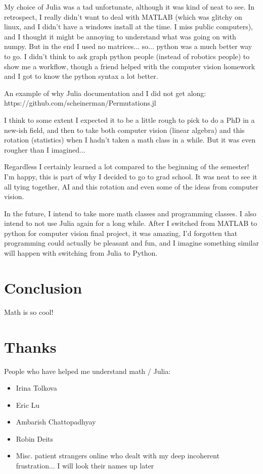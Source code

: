 \documentclass[a4paper]{article}
\begin{document}
My choice of Julia was a tad unfortunate, although it was kind of neat to see.
In retrospect, I really didn't want to deal with MATLAB (which was glitchy on
linux, and I didn't have a windows install at the time. I miss public
computers), and I thought it might be annoying to understand what was going on
with numpy. But in the end I used no matrices... so... python was a much better
way to go. I didn't think to ask graph python people (instead of robotics
people) to show me a workflow,
though a friend helped with the computer vision homework and I got to know the
python syntax a lot better.

An example of why Julia documentation and I did not get along:
https://github.com/scheinerman/Permutations.jl

I think to some extent I expected it to be a little rough to pick to do a PhD in a new-ish
field, and then to take both computer vision (linear algebra) and this rotation
(statistics) when I hadn't taken a math class in a while. But it was even
rougher than I imagined...

Regardless I certainly learned a lot compared to the beginning of the semester!
I'm happy, this is part of why I decided to go to grad school. It was
neat to see it all tying together, AI and this rotation and even some of the
ideas from computer vision.

In the future, I intend to take more math classes and programming classes. I
also intend to not use Julia again for a long while. After I switched from
MATLAB to python for computer vision final project, it was amazing, I'd
forgotten that programming could actually be pleasant and fun, and I imagine
something similar will happen with switching from Julia to Python.

\section{Conclusion}

Math is so cool!

\section{Thanks}

People who have helped me understand math / Julia:

\begin{itemize}
    \item Irina Tolkova
    \item Eric Lu 
    \item Ambarish Chattopadhyay
    \item Robin Deits
    \item Misc. patient strangers online who dealt with my deep incoherent
        frustration... I will look their names up later 
\end{itemize}
\end{document}
